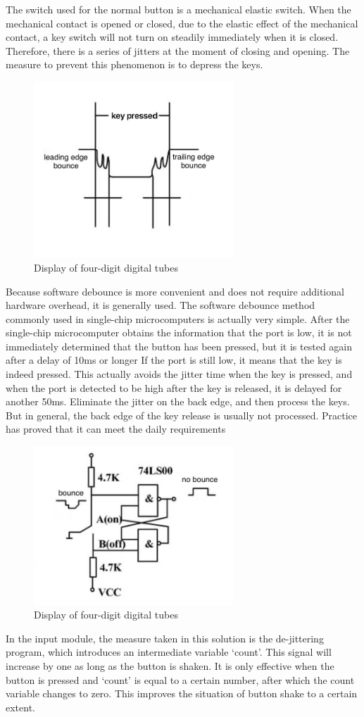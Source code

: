 \documentclass[conference,compsoc]{IEEEtran}
\begin{document}
The switch used for the normal button is a mechanical elastic switch. When the mechanical contact is opened or closed, due to the elastic effect of the mechanical contact, a key switch will not turn on steadily immediately when it is closed. Therefore, there is a series of jitters at the moment of closing and opening. The measure to prevent this phenomenon is to depress the keys. 
\begin{figure}[H]
	\centering
	\includegraphics[width=7.5cm]{fig7}
	\caption{Display of four-digit digital tubes}
	\label{Fig7}
\end{figure}
Because software debounce is more convenient and does not require additional hardware overhead, it is generally used. The software debounce method commonly used in single-chip microcomputers is actually very simple. After the single-chip microcomputer obtains the information that the port is low, it is not immediately determined that the button has been pressed, but it is tested again after a delay of 10ms or longer If the port is still low, it means that the key is indeed pressed. This actually avoids the jitter time when the key is pressed, and when the port is detected to be high after the key is released, it is delayed for another 50ms. Eliminate the jitter on the back edge, and then process the keys. But in general, the back edge of the key release is usually not processed. Practice has proved that it can meet the daily requirements
\begin{figure}[H]
	\centering
	\includegraphics[width=7.5cm]{fig8}
	\caption{Display of four-digit digital tubes}
	\label{Fig5}
\end{figure}
 In the input module, the measure taken in this solution is the de-jittering program, which introduces an intermediate variable ‘count’. This signal will increase by one as long as the button is shaken. It is only effective when the button is pressed and ‘count’ is equal to a certain number, after which the count variable changes to zero. This improves the situation of button shake to a certain extent.
\end{document}
